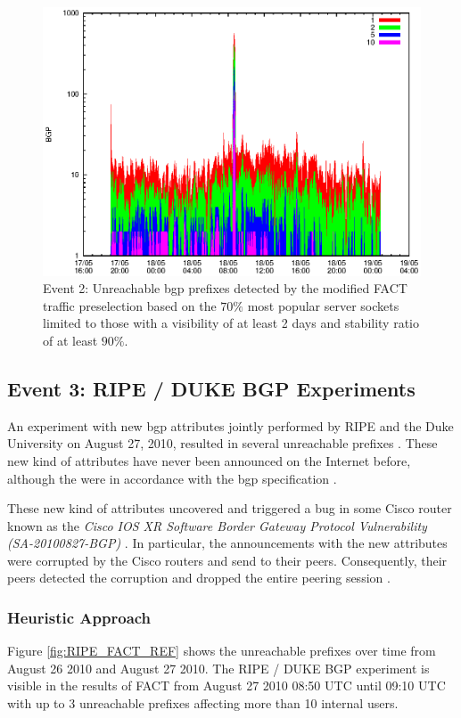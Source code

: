\begin{figure}
	[p] \centering 
	\includegraphics[width=0.75\linewidth]{images/events/2010_05_18/bgp_log_Set_var_0_1_stab_9_vts_2.eps} \caption{Event 2: Unreachable \gls{bgp} prefixes detected by the modified \gls{FACT} traffic preselection based on the $70\%$ most popular \glspl{server socket} limited to those with a visibility of at least 2 days and stability ratio of at least $90\%$.} 
	\label{fig:TIER1_FACT_popularVTS2STAB9} 
\end{figure}

\newpage 
\subsection{Event 3: RIPE / DUKE BGP Experiments}

An experiment with new \gls{bgp} attributes jointly performed by RIPE and the Duke University on August 27, 2010, resulted in several unreachable prefixes \citep{SchatzmannPAM2011}. 
These new kind of attributes have never been announced on the Internet before, although the were in accordance with the \gls{bgp} specification \citep{ripe_duke}.

These new kind of attributes uncovered and triggered a bug in some Cisco router known as the \emph{Cisco IOS XR Software Border Gateway Protocol Vulnerability (SA-20100827-BGP)} \citep{cisco_vulnerability}. 
In particular, the announcements with the new attributes were corrupted by the Cisco routers and send to their peers. 
Consequently, their peers detected the corruption and dropped the entire peering session \citep{ripe_duke}.

\subsubsection{Heuristic Approach} 
Figure \ref{fig:RIPE_FACT_REF} shows the unreachable prefixes over time from August 26 2010 and August 27 2010. 
The RIPE / DUKE BGP experiment is visible in the results of \gls{FACT} from August 27 2010 08:50 UTC until 09:10 UTC with up to 3 unreachable prefixes affecting more than 10 internal users. 

